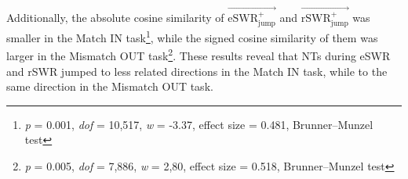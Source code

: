 \documentclass[preprint,review,12pt]{elsarticle}%
\begin{document}
\\
\indent
Additionally, the absolute cosine similarity of $\overrightarrow{\mathrm{eSWR_{jump}^+}}$ and $\overrightarrow{\mathrm{rSWR_{jump}^+}}$ was smaller in the Match IN task\footnote{\textit{p} = 0.001, \textit{dof} = 10,517, \textit{w} = -3.37, effect size = 0.481, Brunner--Munzel test}, while the signed cosine similarity of them was larger in the Mismatch OUT task\footnote{\textit{p} = 0.005, \textit{dof} = 7,886, \textit{w} = 2,80, effect size = 0.518, Brunner--Munzel test}. These results reveal that NTs during eSWR and rSWR jumped to less related directions in the Match IN task, while to the same direction in the Mismatch OUT task.

\end{document}
